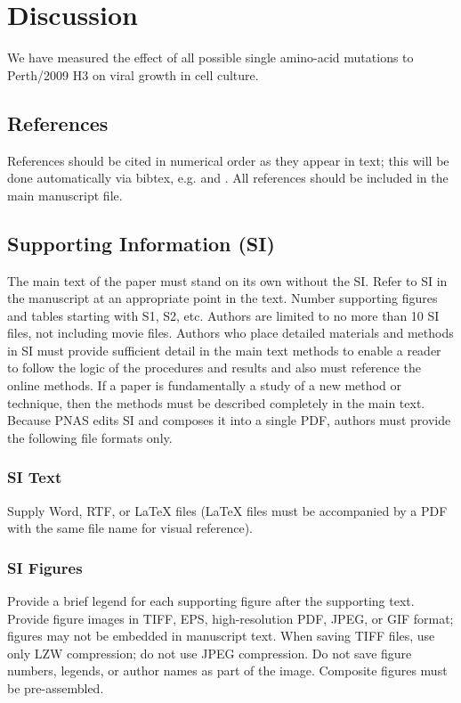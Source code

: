 \documentclass[9pt,twocolumn,twoside]{pnas-new}
\begin{document}
\section*{Discussion}
\label{sec:discussion}
We have measured the effect of all possible single amino-acid mutations to Perth/2009 H3 on viral growth in cell culture.


\subsection*{References}

References should be cited in numerical order as they appear in text; this will be done automatically via bibtex, e.g. \cite{belkin2002using} and \cite{berard1994embedding,coifman2005geometric}. All references should be included in the main manuscript file.  


\subsection*{Supporting Information (SI)}

The main text of the paper must stand on its own without the SI. Refer to SI in the manuscript at an appropriate point in the text. Number supporting figures and tables starting with S1, S2, etc. Authors are limited to no more than 10 SI files, not including movie files. Authors who place detailed materials and methods in SI must provide sufficient detail in the main text methods to enable a reader to follow the logic of the procedures and results and also must reference the online methods. If a paper is fundamentally a study of a new method or technique, then the methods must be described completely in the main text. Because PNAS edits SI and composes it into a single PDF, authors must provide the following file formats only.

\subsubsection*{SI Text}

Supply Word, RTF, or LaTeX files (LaTeX files must be accompanied by a PDF with the same file name for visual reference).

\subsubsection*{SI Figures}

Provide a brief legend for each supporting figure after the supporting text. Provide figure images in TIFF, EPS, high-resolution PDF, JPEG, or GIF format; figures may not be embedded in manuscript text. When saving TIFF files, use only LZW compression; do not use JPEG compression. Do not save figure numbers, legends, or author names as part of the image. Composite figures must be pre-assembled.
\end{document}
